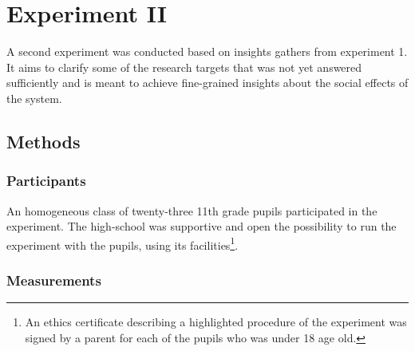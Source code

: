 \documentclass[a4paper,11pt]{article}
\begin{document}
{\section{Experiment II}

A second experiment was conducted based on insights gathers from experiment 1.
It aims to clarify some of the research targets that was not yet answered sufficiently and is meant to achieve fine-grained insights about the social effects of the system.

\subsection{Methods}\label{methods:evaluation}

\subsubsection{Participants}

An homogeneous class of twenty-three 11th grade pupils participated in the experiment.
The high-school was supportive and open the possibility to run the experiment with the pupils, using its facilities\footnote{An ethics certificate describing a highlighted procedure of the experiment was signed by a parent for each of the pupils who was under 18 age old.}.

\subsubsection{Measurements}

}
\end{document}
